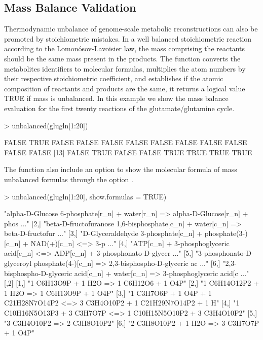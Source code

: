 \subsection{Mass Balance Validation}
Thermodynamic unbalance of genome-scale metabolic reconstructions can also be promoted by stoichiometric mistakes. In a well balanced stoichiometric reaction according to the Lomonósov-Lavoisier law, the mass comprising the reactants should be the same mass present in the products. The  function converts the metabolites identifiers to molecular formulas, multiplies the atom numbers by their respective stoichiometric coefficient, and establishes if the atomic composition of reactants and products are the same, it returns a logical value TRUE if mass is unbalanced. In this example we show the mass balance evaluation for the first twenty reactions of the glutamate/glutamine cycle.
\begin{Schunk}
\begin{Sinput}
> unbalanced(glugln[1:20])
\end{Sinput}
\begin{Soutput}
 [1] FALSE  TRUE FALSE FALSE FALSE FALSE FALSE FALSE FALSE FALSE FALSE FALSE
[13] FALSE  TRUE FALSE FALSE  TRUE  TRUE  TRUE  TRUE
\end{Soutput}
The  function also include an option to show the molecular formula of mass unbalanced formulas through the option .
\begin{Sinput}
> unbalanced(glugln[1:20], show.formulas = TRUE)
\end{Sinput}
\begin{Soutput}
     [,1]                                                                                                                                                  
[1,] "alpha-D-Glucose 6-phosphate[r_n] + water[r_n] => alpha-D-Glucose[r_n] + phos ..."                                                          
[2,] "beta-D-fructofuranose 1,6-bisphosphate[c_n] + water[c_n] => beta-D-fructofur ..."                             
[3,] "D-Glyceraldehyde 3-phosphate[c_n] + phosphate(3-)[c_n] + NAD(+)[c_n] <=> 3-p ..."
[4,] "ATP[c_n] + 3-phosphoglyceric acid[c_n] <=> ADP[c_n] + 3-phosphonato-D-glycer ..."                                                  
[5,] "3-phosphonato-D-glyceroyl phosphate(4-)[c_n] => 2,3-bisphospho-D-glyceric ac ..."                                                                 
[6,] "2,3-bisphospho-D-glyceric acid[c_n] + water[c_n] => 3-phosphoglyceric acid[c ..."                                                
     [,2]                                                                         
[1,] "1 C6H13O9P + 1 H2O => 1 C6H12O6 + 1 O4P"                                    
[2,] "1 C6H14O12P2 + 1 H2O => 1 C6H13O9P + 1 O4P"                                 
[3,] "1 C3H7O6P + 1 O4P + 1 C21H28N7O14P2 <=> 3 C3H4O10P2 + 1 C21H29N7O14P2 + 1 H"
[4,] "1 C10H16N5O13P3 + 3 C3H7O7P <=> 1 C10H15N5O10P2 + 3 C3H4O10P2"              
[5,] "3 C3H4O10P2 => 2 C3H8O10P2"                                                 
[6,] "2 C3H8O10P2 + 1 H2O => 3 C3H7O7P + 1 O4P"                                   
\end{Soutput}
\end{Schunk}


